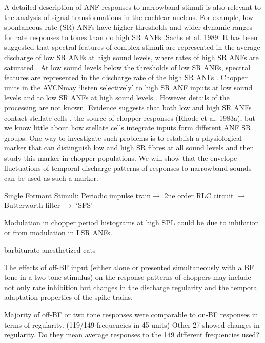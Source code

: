 \documentclass[10pt,a4paper]{article}
\begin{document}
A detailed description of ANF responses to narrowband stimuli is also relevant
to the analysis of signal transformations in the cochlear nucleus.  For example,
low spontaneous rate (SR) ANFs have higher thresholds and wider dynamic ranges
for rate responses to tones than do high SR ANFs \citep{Liberman:1978}{,Sachs et
  al. 1989}.  It has been suggested that spectral features of complex stimuli
are represented in the average discharge of low SR ANFs at high sound levels,
where rates of high SR ANFs are saturated
\citep{Delgutte:1982,WinslowBartaEtAl:1987}.  At low sound levels below the
thresholds of low SR ANFs, spectral features are represented in the discharge
rate of the high SR ANFs \citep{SachsYoung:1979}.  Chopper units in the AVCNmay
{\textquoteleft}listen selectively{\textquoteright} to high SR ANF inputs at low
sound levels and to low SR ANFs at high sound levels
\citep{BlackburnSachs:1990}.  However details of the processing are not known.
Evidence suggests that both low and high SR ANFs contact stellate cells
\citep{Liberman:1991,Ryugo:1992}, the source of chopper responses (Rhode et
al. 1983a), but we know little about how stellate cells integrate inputs form
different ANF SR groups.  One way to investigate such problems is to establish a
physiological marker that can distinguish low and high SR fibres at all sound
levels and then study this marker in chopper populations.  We will show that the
envelope fluctuations of temporal discharge patterns of responses to narrowband
sounds can be used as such a marker.

Single Formant Stimuli: Periodic impulse train\ensuremath{\rightarrow} 2ne order
RLC circuit \ensuremath{\rightarrow} Butterworth filter \ensuremath{\rightarrow}
{\textquoteleft}SFS{\textquoteright}

Modulation in chopper period histograms at high SPL could be due to inhibition
or from modulation in LSR ANFs.

\citep{BlackburnSachs:1992} barbiturate-anesthetized cats

The effects of off-BF input (either alone or presented simultaneously with a BF
tone in a two-tone stimulus) on the response patterns of choppers may include
not only rate inhibition but changes in the discharge regularity and the
temporal adaptation properties of the spike trains.

Majority of off-BF or two tone responses were comparable to on-BF responses in
terms of regularity. (119/149 frequencies in 45 units) Other 27 showed changes
in regularity. Do they mean average responses to the 149 different frequencies
used?
\end{document}
